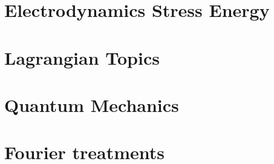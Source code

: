 \part{Electrodynamics Stress Energy}
   
   
   
   
   
   
   
   
   
   
   

\part{Lagrangian Topics}
   
   
   
   
   
   

\part{Quantum Mechanics}
   
   
   
   
   
   
   
   

\part{Fourier treatments}
   
   
   
   
   
   
   
   
   
